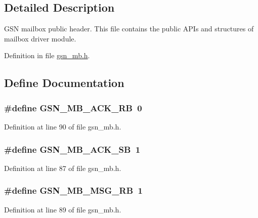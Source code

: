 \subsection{Detailed Description}
GSN mailbox public header. This file contains the public APIs and structures of mailbox driver module. 

Definition in file \hyperlink{a00525_source}{gsn\_\-mb.h}.



\subsection{Define Documentation}
\hypertarget{a00525_abac20b8f3cace42e16aa0203cade4d34}{
\subsubsection[{GSN\_\-MB\_\-ACK\_\-RB}]{\setlength{\rightskip}{0pt plus 5cm}\#define GSN\_\-MB\_\-ACK\_\-RB~0}}
\label{a00525_abac20b8f3cace42e16aa0203cade4d34}


Definition at line 90 of file gsn\_\-mb.h.

\hypertarget{a00525_a36736dbc3bbc82dec117864da76b7902}{
\subsubsection[{GSN\_\-MB\_\-ACK\_\-SB}]{\setlength{\rightskip}{0pt plus 5cm}\#define GSN\_\-MB\_\-ACK\_\-SB~1}}
\label{a00525_a36736dbc3bbc82dec117864da76b7902}


Definition at line 87 of file gsn\_\-mb.h.

\hypertarget{a00525_a71a810f6bb430724f2f85a08d82cbb7a}{
\subsubsection[{GSN\_\-MB\_\-MSG\_\-RB}]{\setlength{\rightskip}{0pt plus 5cm}\#define GSN\_\-MB\_\-MSG\_\-RB~1}}
\label{a00525_a71a810f6bb430724f2f85a08d82cbb7a}


Definition at line 89 of file gsn\_\-mb.h.

